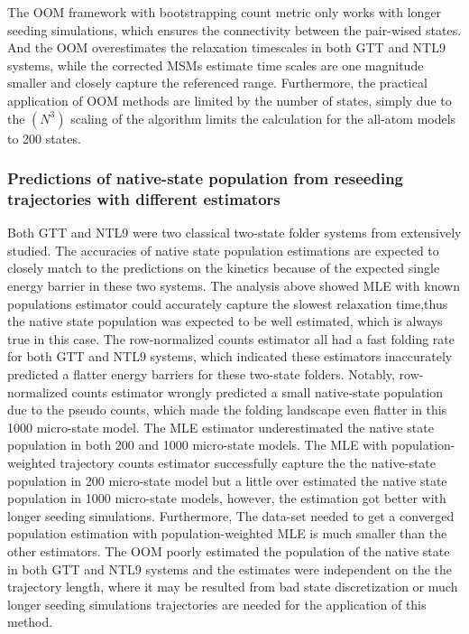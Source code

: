 \documentclass[%
 aip,
rsi,%
 amsmath,amssymb,
 reprint,%
]{revtex4-1}
\begin{document}
The OOM framework with bootstrapping count metric only works with longer seeding simulations, which ensures the connectivity between the pair-wised states. And the OOM overestimates the relaxation timescales in both GTT and NTL9 systems, while the corrected MSMs estimate time scales are one magnitude smaller and closely capture the referenced range. Furthermore, the practical application of OOM methods are limited by the number of states, simply due to the $(N^3)$  scaling of the algorithm limits the calculation for the all-atom models to 200 states.

\subsubsection{Predictions of native-state population from reseeding trajectories with different estimators}

Both GTT and NTL9 were two classical two-state folder systems from extensively studied. The accuracies of native state population estimations are expected to closely match to the predictions on the kinetics because of the expected single energy barrier in these two systems. The analysis above showed MLE with known populations estimator could accurately capture the slowest relaxation time,thus the native state population was expected to be well estimated, which is always true in this case.  The row-normalized counts estimator all had a fast folding rate for both GTT and NTL9 systems, which indicated these estimators inaccurately predicted a flatter energy barriers for these two-state folders. Notably, row-normalized counts estimator wrongly predicted a small native-state population due to the pseudo counts, which made the folding landscape even flatter in this 1000 micro-state model. The MLE estimator underestimated the native state population in both 200 and 1000 micro-state models. The MLE with population-weighted trajectory counts estimator successfully capture the the native-state population in 200 micro-state model but a little over estimated the native state population in 1000 micro-state models, however, the estimation got better with longer seeding simulations. Furthermore, The data-set needed to get a converged population estimation with population-weighted MLE is much smaller than the other estimators. The OOM poorly estimated the population of the native state in both GTT and NTL9 systems and the estimates were independent on the the trajectory length, where it may be resulted from bad state discretization or much longer seeding simulations trajectories are needed for the application of this method.
\end{document}
